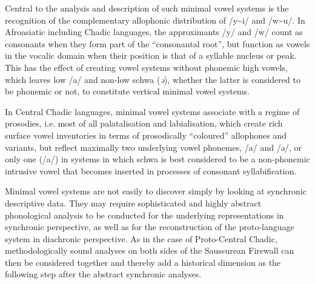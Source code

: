 \documentclass[output=paper]{langscibook}
\begin{document}
Central to the analysis and description of such minimal vowel systems is the recognition of the complementary allophonic distribution of /y{\textasciitilde}i/ and /w{\textasciitilde}u/. In Afroasiatic including Chadic languages, the approximants /y/ and /w/ count as consonants when they form part of the ``consonantal root'', but function as vowels in the vocalic domain when their position is that of a syllable nucleus or peak. This has the effect of creating vowel systems without phonemic high vowels, which leaves low /a/ and non-low schwa (\textit{ə}), whether the latter is considered to be phonemic or not, to constitute vertical minimal vowel systems.

In Central Chadic languages, minimal vowel systems associate with a regime of prosodies, i.e. most of all palatalisation and labialisation, which create rich surface vowel inventories in terms of prosodically ``coloured'' allophones and variants, but reflect maximally two underlying vowel phonemes, /a/ and /ə/, or only one (/a/) in systems in which schwa is best considered to be a non-phonemic intrusive vowel that becomes inserted in processes of consonant syllabification.

Minimal vowel systems are not easily to discover simply by looking at synchronic descriptive data. They may require sophisticated and highly abstract phonological analysis to be conducted for the underlying representations in synchronic perspective, as well as for the reconstruction of the proto-language system in diachronic perspective. As in the case of Proto-Central Chadic, methodologically sound analyses on both sides of the Saussurean Firewall can then be considered together and thereby add a historical dimension as the following step after the abstract synchronic analyses. 

\sloppy\printbibliography[heading=subbibliography,notkeyword=this]
\end{document}
